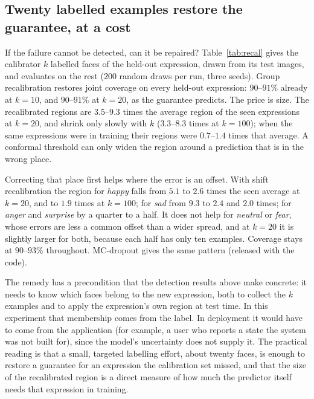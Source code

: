 \subsection{Twenty labelled examples restore the guarantee, at a cost}
\label{sec:recal}
If the failure cannot be detected, can it be repaired? Table~\ref{tab:recal}
gives the calibrator $k$ labelled faces of the held-out expression, drawn from
its test images, and evaluates on the rest ($200$ random draws per run, three
seeds). Group recalibration restores joint coverage on every held-out
expression: $90$--$91\%$ already at $k=10$, and $90$--$91\%$ at $k=20$, as
the guarantee predicts. The price is size. The recalibrated regions are
$3.5$--$9.3$ times the average region of the seen expressions at $k=20$, and
shrink only slowly with $k$ ($3.3$--$8.3$ times at $k=100$); when the same
expressions were in training their regions were $0.7$--$1.4$ times that
average. A conformal threshold can only widen the region around a prediction
that is in the wrong place.

Correcting that place first helps where the error is an offset. With shift
recalibration the region for \emph{happy} falls from $5.1$ to $2.6$ times the
seen average at $k=20$, and to $1.9$ times at $k=100$; for \emph{sad} from $9.3$
to $2.4$ and $2.0$ times; for \emph{anger} and \emph{surprise} by a quarter to
a half. It does not help for \emph{neutral} or \emph{fear}, whose errors are
less a common offset than a wider spread, and at $k=20$ it is slightly larger
for both, because each half has only ten examples. Coverage stays at
$90$--$93\%$ throughout. MC-dropout gives the same pattern (released with the
code).

The remedy has a precondition that the detection results above make concrete:
it needs to know which faces belong to the new expression, both to collect the
$k$ examples and to apply the expression's own region at test time. In this
experiment that membership comes from the label. In deployment it would have to
come from the application (for example, a user who reports a state the system
was not built for), since the model's uncertainty does not supply it. The
practical reading is that a small, targeted labelling effort, about twenty
faces, is enough to restore a guarantee for an expression the calibration set
missed, and that the size of the recalibrated region is a direct measure of how
much the predictor itself needs that expression in training.


